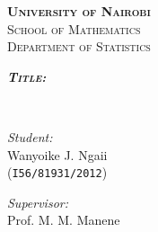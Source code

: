 \documentclass[11pt,leqno]{article}
\numberwithin{equation}{subsection}
\begin{document}
\begin{titlepage}
\begin{center}
\textsc{\Huge \textbf{University of Nairobi}}\\[2cm]

\textsc{\LARGE School of Mathematics}\\[.5cm]
\textsc{\Large Department of Statistics}\\[3cm]



\begin{minipage}[t]{.2\textwidth}
\begin{flushleft}
\textsc{\large \textbf{\textit{Title:}}}
\end{flushleft}
\end{minipage}%
%
\begin{minipage}[t]{.8\textwidth}
\begin{flushleft}
\textsc{\large \textbf{}}
\end{flushleft}
\end{minipage}\\[1cm]%

\begin{minipage}[t]{.5\textwidth}
\begin{flushleft}
\textit{Student:}\\ Wanyoike J. Ngaii\\ (\texttt{I56/81931/2012})
\end{flushleft}
\end{minipage}%
%
\begin{minipage}[t]{.5\textwidth}
\begin{flushright}
\textit{Supervisor:}\\ Prof. M. M. Manene
\end{flushright}
\end{minipage}\\[0.25cm]%

\begin{abstract}

\end{abstract}


 
\end{center}
\end{titlepage}

%
% 
\pagestyle{plain}
%





\appendix
%
%

\end{document}
